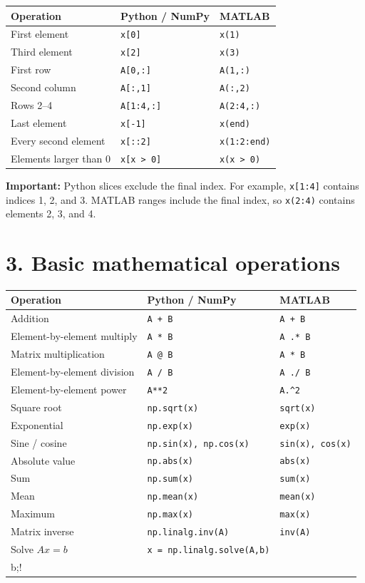 \documentclass[9pt]{extarticle}
\newcommand{\py}[1]{\lstinline[style=code]!#1!}
\newcommand{\matlab}[1]{\lstinline[style=code]!#1!}
\begin{document}
\begin{tabularx}{\textwidth}{>{\raggedright\arraybackslash}p{} X X}
\toprule
\textbf{Operation} & \textbf{Python / NumPy} & \textbf{MATLAB} \\
\midrule
First element & \py{x[0]} & \matlab{x(1)} \\
Third element & \py{x[2]} & \matlab{x(3)} \\
First row & \py{A[0,:]} & \matlab{A(1,:)} \\
Second column & \py{A[:,1]} & \matlab{A(:,2)} \\
Rows 2--4 & \py{A[1:4,:]} & \matlab{A(2:4,:)} \\
Last element & \py{x[-1]} & \matlab{x(end)} \\
Every second element & \py{x[::2]} & \matlab{x(1:2:end)} \\
Elements larger than 0 & \py{x[x > 0]} & \matlab{x(x > 0)} \\
\bottomrule
\end{tabularx}

\textbf{Important:} Python slices exclude the final index. For example, \py{x[1:4]} contains indices 1, 2, and 3. MATLAB ranges include the final index, so \matlab{x(2:4)} contains elements 2, 3, and 4.

\section*{3. Basic mathematical operations}

\begin{tabularx}{\textwidth}{>{\raggedright\arraybackslash}p{} X X}
\toprule
\textbf{Operation} & \textbf{Python / NumPy} & \textbf{MATLAB} \\
\midrule
Addition & \py{A + B} & \matlab{A + B} \\
Element-by-element multiply & \py{A * B} & \matlab{A .* B} \\
Matrix multiplication & \py{A @ B} & \matlab{A * B} \\
Element-by-element division & \py{A / B} & \matlab{A ./ B} \\
Element-by-element power & \py{A**2} & \matlab{A.^2} \\
Square root & \py{np.sqrt(x)} & \matlab{sqrt(x)} \\
Exponential & \py{np.exp(x)} & \matlab{exp(x)} \\
Sine / cosine & \py{np.sin(x), np.cos(x)} & \matlab{sin(x), cos(x)} \\
Absolute value & \py{np.abs(x)} & \matlab{abs(x)} \\
Sum & \py{np.sum(x)} & \matlab{sum(x)} \\
Mean & \py{np.mean(x)} & \matlab{mean(x)} \\
Maximum & \py{np.max(x)} & \matlab{max(x)} \\
Matrix inverse & \py{np.linalg.inv(A)} & \matlab{inv(A)} \\
Solve $Ax=b$ & \py{x = np.linalg.solve(A,b)} & \matlab{x = A\\b;} \\
\bottomrule
\end{tabularx}
\end{document}
